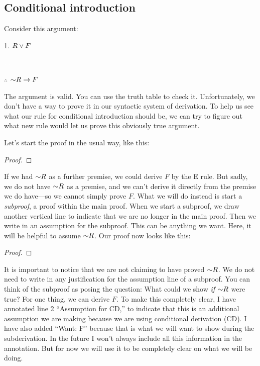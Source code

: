 \subsection{Conditional introduction}
Consider this argument:
\begin{earg}
\item[1.] $R \vee F$
\item[] \textcolor{white}{.}\sout{\hspace{.2\linewidth}} \textcolor{white}{.}
\item[$\therefore$] $\mathord{\sim} R \rightarrow F$
\end{earg}
The argument is valid. You can use the truth table to check it. Unfortunately, we don't have a way to prove it in our syntactic system of derivation. To help us see what our rule for conditional introduction should be, we can try to figure out what new rule would let us prove this obviously true argument.

Let's start the proof in the usual way, like this:

\begin{proof}
	 
\end{proof}

If we had $\mathord{\sim} R$ as a further premise, we could derive $F$ by the {\eor}E rule. But sadly, we do not have $\mathord{\sim} R$ as a premise, and we can't derive it directly from the premise we do have---so we cannot simply prove $F$. What we will do instead is start a \emph{subproof}, a proof within the main proof. When we start a subproof, we draw another vertical line to indicate that we are no longer in the main proof. Then we write in an assumption for the subproof. This can be anything we want. Here, it will be helpful to assume $\mathord{\sim} R$. Our proof now looks like this:

\begin{proof}
	\open
	\close
\end{proof}

It is important to notice that we are not claiming to have proved $\mathord{\sim} R$. We do not need to write in any justification for the assumption line of a subproof. You can think of the subproof as posing the question: What could we show \emph{if} $\mathord{\sim} R$ were true? For one thing, we can derive $F$. To make this completely clear, I have annotated line 2 ``Assumption for CD,'' to indicate that this is an additional assumption we are making because we are using conditional derivation (CD). I have also added ``Want: F'' because that is what we will want to show during the subderivation. In the future I won't always include all this information in the annotation. But for now we will use it to be completely clear on what we will be doing.

